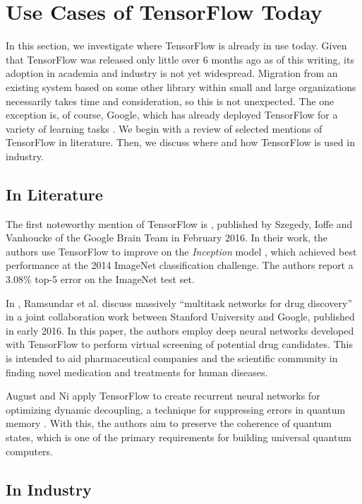 \section{Use Cases of TensorFlow Today}\label{sec:uses}

In this section, we investigate where TensorFlow is already in use today. Given
that TensorFlow was released only little over 6 months ago as of this writing,
its adoption in academia and industry is not yet widespread. Migration from an
existing system based on some other library within small and large organizations
necessarily takes time and consideration, so this is not unexpected. The one
exception is, of course, Google, which has already deployed TensorFlow for a
variety of learning tasks \cite{drugs, phones, emails, deepmind, inception}. We
begin with a review of selected mentions of TensorFlow in literature. Then, we
discuss where and how TensorFlow is used in industry.

\subsection{In Literature}\label{sec:uses-lit}

The first noteworthy mention of TensorFlow is \cite{szegedy2016}, published by
Szegedy, Ioffe and Vanhoucke of the Google Brain Team in February 2016. In their
work, the authors use TensorFlow to improve on the \emph{Inception} model
\cite{inception}, which achieved best performance at the 2014 ImageNet
classification challenge. The authors report a 3.08\% top-5 error on the
ImageNet test set.

In \cite{drugs}, Ramsundar et al. discuss massively ``multitask networks for
drug discovery'' in a joint collaboration work between Stanford University and
Google, published in early 2016. In this paper, the authors employ deep neural
networks developed with TensorFlow to perform virtual screening of potential
drug candidates. This is intended to aid pharmaceutical companies and the
scientific community in finding novel medication and treatments for human
diseases.

August and Ni apply TensorFlow to create recurrent neural networks for
optimizing dynamic decoupling, a technique for suppressing errors in quantum
memory \cite{august}. With this, the authors aim to preserve the coherence of
quantum states, which is one of the primary requirements for building universal
quantum computers.

\subsection{In Industry}\label{sec:uses-industry}

